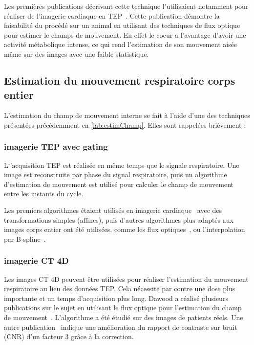 Les premières publications décrivant cette technique l'utilisaient notamment pour réaliser de l'imagerie cardiaque en TEP~\cite{klein19973d}. Cette publication démontre la faisabilité du procédé sur un animal en utilisant des techniques de flux optique pour estimer le champs de mouvement. En effet le coeur a l'avantage d'avoir une activité métabolique intense, ce qui rend l'estimation de son mouvement aisée même sur des images avec une faible statistique.

\subsection{Estimation du mouvement respiratoire corps entier}

L'estimation du champ de mouvement interne se fait à l'aide d'une des techniques présentées précédemment en \ref{lab:estimChamp}. Elles sont rappelées brièvement :

\subsubsection{imagerie TEP avec gating}
\label{lab:correctionDawood2008}

L`'acquisition TEP est réalisée en même temps que le signale respiratoire. Une image est reconstruite par phase du signal respiratoire, puis un algorithme d'estimation de mouvement est utilisé pour calculer le champ de mouvement entre les instants du cycle.

Les premiers algorithmes étaient utilisés en imagerie cardiaque~\cite{klein2002four} avec des transformations simples (affines), puis d'autres algorithmes plus adaptés aux images corps entier ont été utilisées, comme les flux optiques~\cite{dawood2006lung, dawood2006lung}, ou l'interpolation par B-spline~\cite{bai2009regularized}. 


\subsubsection{imagerie CT 4D}

Les images CT 4D peuvent être utilisées pour réaliser l'estimation du mouvement respiratoire au lieu des données TEP. Cela nécessite par contre une dose plus importante et un temps d'acquisition plus long.
Dawood a réalisé plusieurs publications sur le sujet en utilisant le flux optique pour l'estimation du champ de mouvement~\cite{dawood2006lung, dawood2008respiratory}. L'algorithme a été étudié sur des images de patients réels. Une autre publication~\cite{thorndyke2006reducing} indique une amélioration du rapport de contraste sur bruit (CNR) d'un facteur 3 grâce à la correction.


